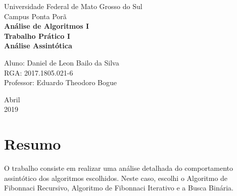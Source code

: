 \documentclass[a4paper, 12pt]{article}
\begin{document}
\begin{titlepage}
    \begin{center}
		\LARGE{Universidade Federal de Mato Grosso do Sul}\\
		\vspace{15pt}
        \large{Campus Ponta Porã}\\ 
        \large{{\textbf{Análise de Algoritmos I}}}\\ 
        \vspace{15pt}
        \vspace{95pt}
        \textbf{\large{Trabalho Prático I}}\\
        \vspace{15pt}
        \textbf{\LARGE{Análise Assintótica}}\\
        \vspace{3,5cm}
    \end{center}
    
    \begin{flushleft}
        \begin{tabbing}
            Aluno: Daniel de Leon Bailo da Silva\\            
            RGA: 2017.1805.021-6\\
            Professor: Eduardo Theodoro Bogue\\
    \end{tabbing}
 \end{flushleft}
    \vspace{1cm}
    
    \begin{center}
        \vspace{\fill}
             Abril\\
         2019
            \end{center}
\end{titlepage}

\newpage
\tableofcontents
\thispagestyle{empty}

\newpage
{}
\section{Resumo}
O trabalho consiste em realizar uma análise detalhada do comportamento assintótico dos algoritmos escolhidos. Neste caso, escolhi o Algoritmo de Fibonnaci Recursivo, Algoritmo de Fibonnaci Iterativo e a Busca Binária. 
\end{document}
